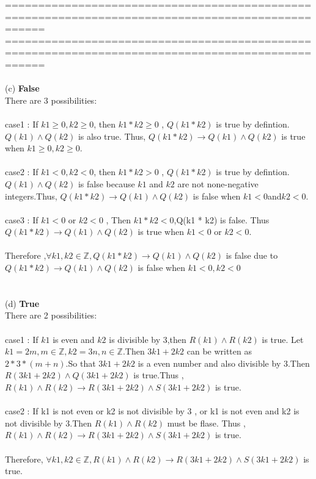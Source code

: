 \documentclass[12pt,a4paper]{article}
\begin{document}
==================================================================================================
\newpage
==================================================================================================
\\\\
(c) \textbf{False}\\
There are 3 possibilities:\\\\
case1  :  If $k1 \geq 0 ,  k2 \geq 0$, then $k1 * k2 \geq 0$ , $Q(k1 * k2)$ is true by defintion.$Q(k1) \land Q(k2)$ is also true. Thus,  $Q(k1 * k2) \rightarrow Q(k1) \land Q(k2)$ is true when $k1 \geq 0 ,  k2 \geq 0$.\\\\
case2 : If $k1 < 0 ,  k2 < 0$, then $k1 * k2 > 0$ , $Q(k1 * k2)$ is true by defintion.$Q(k1) \land Q(k2)$ is false because $k1$ and $k2$ are not none-negative integers.Thus,  $Q(k1 * k2) \rightarrow Q(k1) \land Q(k2)$ is false when $k1 < 0$and$ k2 < 0$.\\\\
case3 : If $k1 < 0$ or $k2 < 0$ , Then $k1 * k2 < 0$,Q(k1 * k2) is false. Thus $Q(k1 * k2) \rightarrow Q(k1) \land Q(k2)$ is true when $k1 < 0$ or $k2 < 0$.\\\\
Therefore ,$\forall k1,k2 \in \mathbb{Z},Q(k1 * k2) \rightarrow Q(k1) \land Q(k2)$ is false due to $Q(k1 * k2) \rightarrow Q(k1) \land Q(k2)$ is false when $k1 < 0 ,  k2 < 0$\\\\\\
(d) \textbf{True}\\
There are 2 possibilities:\\\\
case1 : If $k1$ is even and $k2$ is divisible by 3,then $R(k1) \land R(k2)$ is true. Let $k1 = 2m,m \in \mathbb{Z},k2 = 3n, n \in \mathbb{Z}$.Then $3k1 + 2k2$ can be written as $2 * 3 * (m + n)$.So that $3k1 + 2k2$ is a even number and also divisible by 3.Then 
$R(3k1 + 2k2) \land Q(3k1 + 2k2)$ is true.Thus ,  $R(k1) \land R(k2) \rightarrow R(3k1 +2k2) \land S(3k1 + 2k2)$ is true. \\\\
case2 : If k1 is not even or k2 is not  divisible by 3 , or k1 is not even and k2 is not divisible by 3.Then $R(k1) \land R(k2)$ must be flase. Thus ,$R(k1) \land R(k2) \rightarrow R(3k1 +2k2) \land S(3k1 + 2k2)$ is true. \\\\
Therefore, $\forall k1 , k2 \in \mathbb{Z},R(k1) \land R(k2) \rightarrow R(3k1 +2k2) \land S(3k1 + 2k2)$ is true. \\\\
\end{document}
